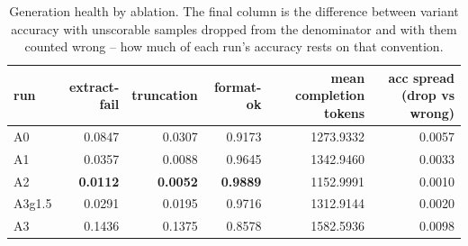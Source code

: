 \begin{table}[t]
\centering
\small
\begin{tabular}{lrrrrr}
\toprule
run & extract-fail & truncation & format-ok & mean completion tokens & acc spread (drop vs wrong) \\
\midrule
A0 & 0.0847 & 0.0307 & 0.9173 & 1273.9332 & 0.0057 \\
A1 & 0.0357 & 0.0088 & 0.9645 & 1342.9460 & 0.0033 \\
A2 & \textbf{0.0112} & \textbf{0.0052} & \textbf{0.9889} & 1152.9991 & 0.0010 \\
A3g1.5 & 0.0291 & 0.0195 & 0.9716 & 1312.9144 & 0.0020 \\
A3 & 0.1436 & 0.1375 & 0.8578 & 1582.5936 & 0.0098 \\
\bottomrule
\end{tabular}
\caption{Generation health by ablation. The final column is the difference between variant accuracy with unscorable samples dropped from the denominator and with them counted wrong -- how much of each run's accuracy rests on that convention.}
\label{tab:asymob_health}
\end{table}